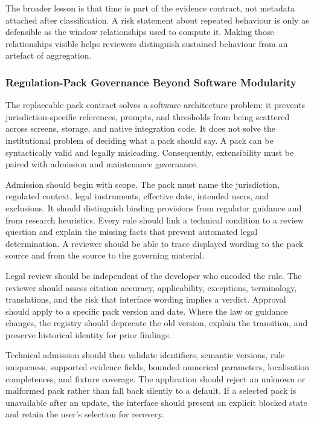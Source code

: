 The broader lesson is that time is part of the evidence contract, not metadata attached after classification. A risk statement about repeated behaviour is only as defensible as the window relationships used to compute it. Making those relationships visible helps reviewers distinguish sustained behaviour from an artefact of aggregation.

\subsubsection{Regulation-Pack Governance Beyond Software Modularity}

The replaceable pack contract solves a software architecture problem: it prevents jurisdiction-specific references, prompts, and thresholds from being scattered across screens, storage, and native integration code. It does not solve the institutional problem of deciding what a pack should say. A pack can be syntactically valid and legally misleading. Consequently, extensibility must be paired with admission and maintenance governance.

Admission should begin with scope. The pack must name the jurisdiction, regulated context, legal instruments, effective date, intended users, and exclusions. It should distinguish binding provisions from regulator guidance and from research heuristics. Every rule should link a technical condition to a review question and explain the missing facts that prevent automated legal determination. A reviewer should be able to trace displayed wording to the pack source and from the source to the governing material.

Legal review should be independent of the developer who encoded the rule. The reviewer should assess citation accuracy, applicability, exceptions, terminology, translations, and the risk that interface wording implies a verdict. Approval should apply to a specific pack version and date. Where the law or guidance changes, the registry should deprecate the old version, explain the transition, and preserve historical identity for prior findings.

Technical admission should then validate identifiers, semantic versions, rule uniqueness, supported evidence fields, bounded numerical parameters, localisation completeness, and fixture coverage. The application should reject an unknown or malformed pack rather than fall back silently to a default. If a selected pack is unavailable after an update, the interface should present an explicit blocked state and retain the user's selection for recovery.


